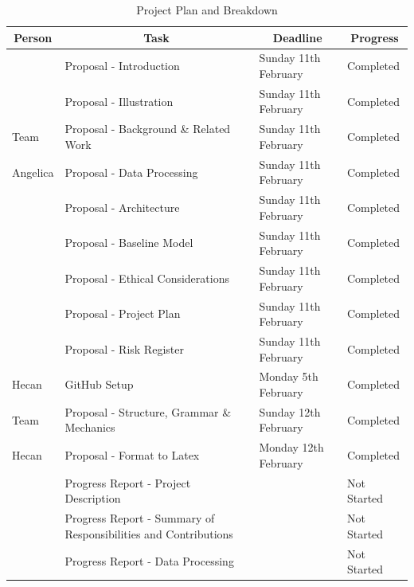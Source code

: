 \documentclass{article} %
\begin{document}
\begin{table}[t]
\caption{Project Plan and Breakdown}
\label{sample-table}
\begin{center}
\begin{tabular}{l|l|l|l}
\hline
\multicolumn{1}{c}{\bf Person} & \multicolumn{1}{c}{\bf Task} & \multicolumn{1}{c}{\bf Deadline} & \multicolumn{1}{c}{\bf Progress} \\
\hline
                & Proposal - Introduction                            & Sunday 11th February & Completed \\
                & Proposal - Illustration                            & Sunday 11th February & Completed \\
Team           & Proposal - Background \& Related Work              & Sunday 11th February & Completed \\
Angelica       & Proposal - Data Processing                         & Sunday 11th February & Completed \\
                & Proposal - Architecture                            & Sunday 11th February & Completed \\
                & Proposal - Baseline Model                          & Sunday 11th February & Completed \\
                & Proposal - Ethical Considerations                  & Sunday 11th February & Completed \\
                & Proposal - Project Plan                            & Sunday 11th February & Completed \\
                & Proposal - Risk Register                           & Sunday 11th February & Completed \\
Hecan          & GitHub Setup                                       & Monday 5th February  & Completed \\
Team           & Proposal - Structure, Grammar \& Mechanics        & Sunday 12th February & Completed \\
Hecan          & Proposal - Format to Latex                         & Monday 12th February & Completed \\
                & Progress Report - Project Description              &                      & Not Started \\
                & Progress Report - Summary of Responsibilities and Contributions & & Not Started \\
                & Progress Report - Data Processing                  &                      & Not Started \\

\end{tabular}
\end{center}
\end{table}
\end{document}
